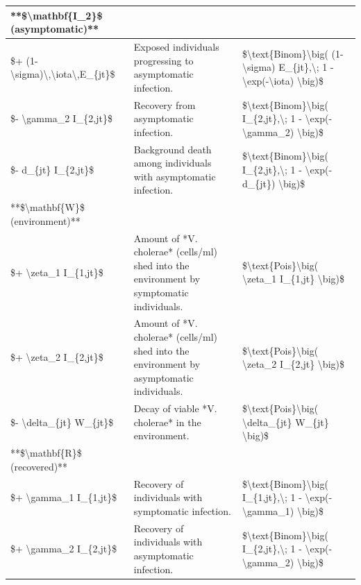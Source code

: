 \documentclass[
]{book}
\begin{document}
\begin{table}
\begin{tabular}[t]{l|l|l}
\hline
**\$\textbackslash{}mathbf\{I\_2\}\$ (asymptomatic)** &  & \\
\hline
\$+ (1-\textbackslash{}sigma)\textbackslash{},\textbackslash{}iota\textbackslash{},E\_\{jt\}\$ & Exposed individuals progressing to asymptomatic infection. & \$\textbackslash{}text\{Binom\}\textbackslash{}big( (1-\textbackslash{}sigma) E\_\{jt\},\textbackslash{}; 1 - \textbackslash{}exp(-\textbackslash{}iota) \textbackslash{}big)\$\\
\hline
\$- \textbackslash{}gamma\_2 I\_\{2,jt\}\$ & Recovery from asymptomatic infection. & \$\textbackslash{}text\{Binom\}\textbackslash{}big( I\_\{2,jt\},\textbackslash{}; 1 - \textbackslash{}exp(-\textbackslash{}gamma\_2) \textbackslash{}big)\$\\
\hline
\$- d\_\{jt\} I\_\{2,jt\}\$ & Background death among individuals with asymptomatic infection. & \$\textbackslash{}text\{Binom\}\textbackslash{}big( I\_\{2,jt\},\textbackslash{}; 1 - \textbackslash{}exp(-d\_\{jt\}) \textbackslash{}big)\$\\
\hline
**\$\textbackslash{}mathbf\{W\}\$ (environment)** &  & \\
\hline
\$+ \textbackslash{}zeta\_1 I\_\{1,jt\}\$ & Amount of *V. cholerae* (cells/ml) shed into the environment by symptomatic individuals. & \$\textbackslash{}text\{Pois\}\textbackslash{}big( \textbackslash{}zeta\_1 I\_\{1,jt\} \textbackslash{}big)\$\\
\hline
\$+ \textbackslash{}zeta\_2 I\_\{2,jt\}\$ & Amount of *V. cholerae* (cells/ml) shed into the environment by asymptomatic individuals. & \$\textbackslash{}text\{Pois\}\textbackslash{}big( \textbackslash{}zeta\_2 I\_\{2,jt\} \textbackslash{}big)\$\\
\hline
\$- \textbackslash{}delta\_\{jt\} W\_\{jt\}\$ & Decay of viable *V. cholerae* in the environment. & \$\textbackslash{}text\{Pois\}\textbackslash{}big( \textbackslash{}delta\_\{jt\} W\_\{jt\} \textbackslash{}big)\$\\
\hline
**\$\textbackslash{}mathbf\{R\}\$ (recovered)** &  & \\
\hline
\$+ \textbackslash{}gamma\_1 I\_\{1,jt\}\$ & Recovery of individuals with symptomatic infection. & \$\textbackslash{}text\{Binom\}\textbackslash{}big( I\_\{1,jt\},\textbackslash{}; 1 - \textbackslash{}exp(-\textbackslash{}gamma\_1) \textbackslash{}big)\$\\
\hline
\$+ \textbackslash{}gamma\_2 I\_\{2,jt\}\$ & Recovery of individuals with asymptomatic infection. & \$\textbackslash{}text\{Binom\}\textbackslash{}big( I\_\{2,jt\},\textbackslash{}; 1 - \textbackslash{}exp(-\textbackslash{}gamma\_2) \textbackslash{}big)\$\\

\end{tabular}
\end{table}
\end{document}
